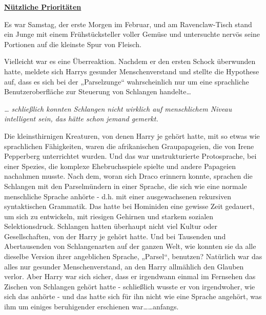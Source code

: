 

\hypertarget{nuxfctzliche-priorituxe4ten}{%

\textbf{\uline{Nützliche Prioritäten}}

Es war Samstag, der erste Morgen im Februar, und am Ravenclaw-Tisch stand ein Junge mit einem Frühstücksteller voller Gemüse und untersuchte nervös seine Portionen auf die kleinste Spur von Fleisch.

Vielleicht war es eine Überreaktion. Nachdem er den ersten Schock überwunden hatte, meldete sich Harrys gesunder Menschenverstand und stellte die Hypothese auf, dass es sich bei der „Parselzunge“ wahrscheinlich nur um eine sprachliche Benutzeroberfläche zur Steuerung von Schlangen handelte…

\emph{… schließlich konnten Schlangen nicht wirklich auf menschlichem Niveau intelligent sein, das hätte schon jemand gemerkt.}

Die kleinsthirnigen Kreaturen, von denen Harry je gehört hatte, mit so etwas wie sprachlichen Fähigkeiten, waren die afrikanischen Graupapageien, die von Irene Pepperberg unterrichtet wurden. Und das war unstrukturierte Protosprache, bei einer Spezies, die komplexe Ehebruchsspiele spielte und andere Papageien nachahmen musste. Nach dem, woran sich Draco erinnern konnte, sprachen die Schlangen mit den Parselmündern in einer Sprache, die sich wie eine normale menschliche Sprache anhörte - d.h. mit einer ausgewachsenen rekursiven syntaktischen Grammatik. Das hatte bei Hominiden eine gewisse Zeit gedauert, um sich zu entwickeln, mit riesigen Gehirnen und starkem sozialen Selektionsdruck. Schlangen hatten überhaupt nicht viel Kultur oder Gesellschaften, von der Harry je gehört hatte. Und bei Tausenden und Abertausenden von Schlangenarten auf der ganzen Welt, wie konnten sie da alle dieselbe Version ihrer angeblichen Sprache, „Parsel“, benutzen? Natürlich war das alles nur gesunder Menschenverstand, an den Harry allmählich den Glauben verlor. Aber Harry war sich sicher, dass er irgendwann einmal im Fernsehen das Zischen von Schlangen gehört hatte - schließlich wusste er von irgendwoher, wie sich das anhörte - und das hatte sich für ihn nicht wie eine Sprache angehört, was ihm um einiges beruhigender erschienen war……anfangs.

}
